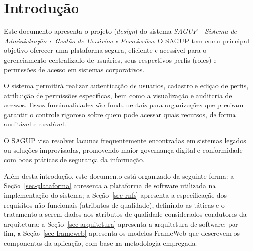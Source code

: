 \chapter{Introdução}
\label{sec-intro}
\vspace{-1cm}

Este documento apresenta o projeto (\textit{design}) do sistema \emph{SAGUP - Sistema de Administração e Gestão de Usuários e Permissões}. O SAGUP tem como principal objetivo oferecer uma plataforma segura, eficiente e acessível para o gerenciamento centralizado de usuários, seus respectivos perfis (roles) e permissões de acesso em sistemas corporativos.

O sistema permitirá realizar autenticação de usuários, cadastro e edição de perfis, atribuição de permissões específicas, bem como a visualização e auditoria de acessos. Essas funcionalidades são fundamentais para organizações que precisam garantir o controle rigoroso sobre quem pode acessar quais recursos, de forma auditável e escalável.

O SAGUP visa resolver lacunas frequentemente encontradas em sistemas legados ou soluções improvisadas, promovendo maior governança digital e conformidade com boas práticas de segurança da informação.

Além desta introdução, este documento está organizado da seguinte forma: 
a Seção~\ref{sec-plataforma} apresenta a plataforma de software utilizada na implementação do sistema;
a Seção~\ref{sec-rnfs} apresenta a especificação dos requisitos não funcionais (atributos de qualidade), definindo as táticas e o tratamento a serem dados aos atributos de qualidade considerados condutores da arquitetura; 
a Seção~\ref{sec-arquitetura} apresenta a arquitetura de software; por fim, 
a Seção~\ref{sec-frameweb} apresenta os modelos FrameWeb que descrevem os componentes da aplicação, com base na metodologia empregada.
